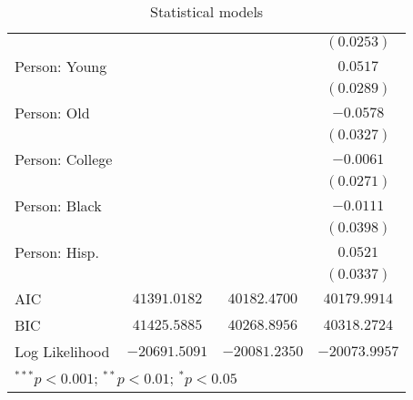 \begin{table}
\begin{center}
\begin{tabular}{l c c c}
                &                 &                 & $(0.0253)$      \\
Person: Young   &                 &                 & $0.0517$        \\
                &                 &                 & $(0.0289)$      \\
Person: Old     &                 &                 & $-0.0578$       \\
                &                 &                 & $(0.0327)$      \\
Person: College &                 &                 & $-0.0061$       \\
                &                 &                 & $(0.0271)$      \\
Person: Black   &                 &                 & $-0.0111$       \\
                &                 &                 & $(0.0398)$      \\
Person: Hisp.   &                 &                 & $0.0521$        \\
                &                 &                 & $(0.0337)$      \\
\midrule
AIC             & $41391.0182$    & $40182.4700$    & $40179.9914$    \\
BIC             & $41425.5885$    & $40268.8956$    & $40318.2724$    \\
Log Likelihood  & $-20691.5091$   & $-20081.2350$   & $-20073.9957$   \\
\bottomrule
\multicolumn{4}{l}{\scriptsize{$^{***}p<0.001$; $^{**}p<0.01$; $^{*}p<0.05$}}
\end{tabular}
\caption{Statistical models}
\label{table:coefficients}
\end{center}
\end{table}
